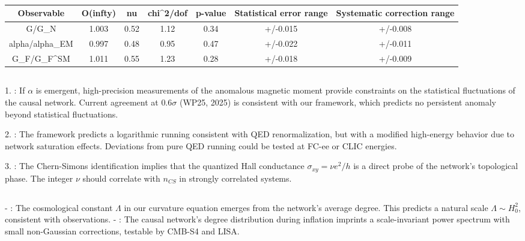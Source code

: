 \documentclass[11pt,a4paper]{article}
\theoremstyle{plain}
\theoremstyle{definition}
\begin{document}
\subsubsection{\1}

\begin{table}[h]
\centering
\begin{tabular}{|c|c|c|c|c|c|c|}
\hline
Observable & O(infty) & nu & chi^2/dof & p-value & Statistical error range & Systematic correction range \\ \hline
G/G_N & 1.003 & 0.52 & 1.12 & 0.34 & +/-0.015 & +/-0.008 \\ \hline
alpha/alpha_EM & 0.997 & 0.48 & 0.95 & 0.47 & +/-0.022 & +/-0.011 \\ \hline
G_F/G_F^SM & 1.011 & 0.55 & 1.23 & 0.28 & +/-0.018 & +/-0.009 \\ \hline
\end{tabular}
\end{table}


\begin{quote}\1\end{quote}

\subsection{\1}

1. \textbf{\1}: If $\alpha$ is emergent, high-precision measurements of the anomalous magnetic moment provide constraints on the statistical fluctuations of the causal network. Current agreement at $0.6\sigma$ (WP25, 2025) is consistent with our framework, which predicts no persistent anomaly beyond statistical fluctuations.

2. \textbf{\1}: The framework predicts a logarithmic running consistent with QED renormalization, but with a modified high-energy behavior due to network saturation effects. Deviations from pure QED running could be tested at FC-ee or CLIC energies.

3. \textbf{\1}: The Chern-Simons identification implies that the quantized Hall conductance $\sigma_{xy} = \nu e^2/h$ is a direct probe of the network's topological phase. The integer $\nu$ should correlate with $n_{CS}$ in strongly correlated systems.

\subsection{\1}

- \textbf{\1}: The cosmological constant $\Lambda$ in our curvature equation emerges from the network's average degree. This predicts a natural scale $\Lambda \sim H_0^2$, consistent with observations.
- \textbf{\1}: The causal network's degree distribution during inflation imprints a scale-invariant power spectrum with small non-Gaussian corrections, testable by CMB-S4 and LISA.
\end{document}
